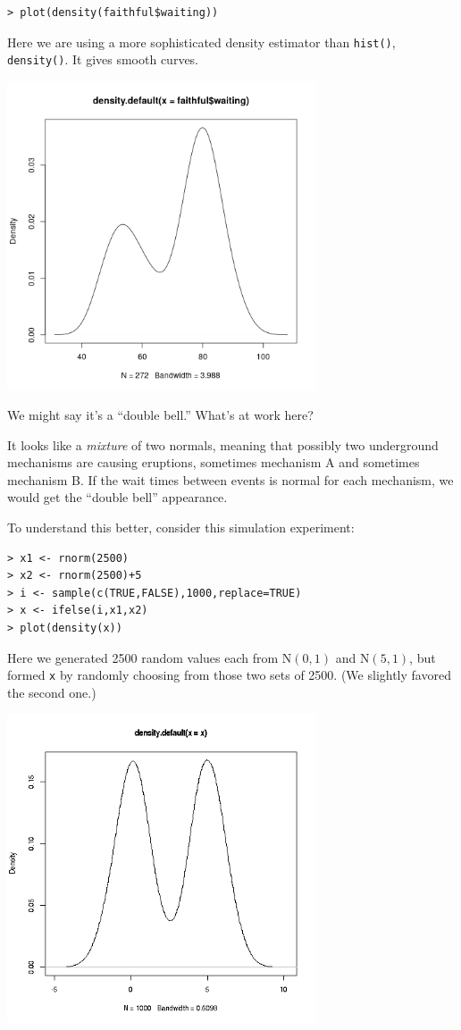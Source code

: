 \begin{lstlisting}
> plot(density(faithful$waiting)) 
\end{lstlisting}

Here we are using a more sophisticated density estimator than
\lstinline{hist()}, \lstinline{density()}.  It gives smooth curves.

\includegraphics[width=3.6in]{Images/DensFaithful.png} 

We might say it's a ``double bell.''  What's at work here?

It looks like a \textit{mixture} of two normals, meaning that possibly
two underground mechanisms are causing eruptions, sometimes mechanism A
and sometimes mechanism B.  If the wait times between events is normal
for each mechanism, we would get the ``double bell'' appearance.

To understand this better, consider this simulation experiment:

\begin{lstlisting}
> x1 <- rnorm(2500) 
> x2 <- rnorm(2500)+5 
> i <- sample(c(TRUE,FALSE),1000,replace=TRUE) 
> x <- ifelse(i,x1,x2) 
> plot(density(x))
\end{lstlisting}

Here we generated 2500 random values each from 
$\textrm{N}(0,1)$ and $\textrm{N}(5,1)$, but formed \lstinline{x}
by randomly choosing from those two sets of 2500.  (We slightly favored
the second one.)

\includegraphics[width=3.6in]{Images/MixSim.png} 

